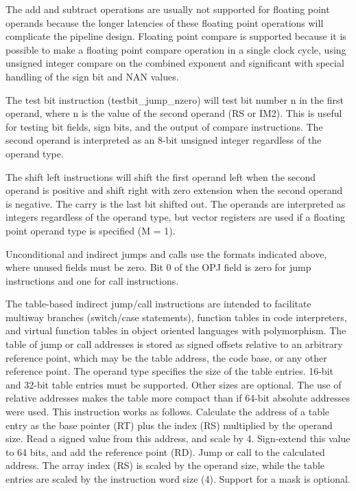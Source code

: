 \documentclass[forwardcom.tex]{subfiles}
\begin{document}
The add and subtract operations are usually not supported for floating point operands because the longer latencies of these floating point operations will complicate the pipeline design. Floating point compare is supported because it is possible to make a floating point compare operation in a single clock cycle, using unsigned integer compare on the combined exponent and significant with special handling of the sign bit and NAN values.
\vspace{2mm}

The test bit instruction (testbit\_jump\_nzero) will test bit number n in the first operand, where n is the value of the second operand (RS or IM2). This is useful for testing bit fields, sign bits, and the output of compare instructions. The second operand is interpreted as an 8-bit unsigned integer regardless of the operand type.
\vspace{2mm}

The shift left instructions will shift the first operand left when the second operand is positive and shift right with zero extension when the second operand is negative. The carry is the last bit shifted out. The operands are interpreted as integers regardless of the operand type, but vector registers are used if a floating point operand type is specified (M = 1).
\vspace{2mm}

Unconditional and indirect jumps and calls use the formats indicated above, where unused fields must be zero. Bit 0 of the OPJ field is zero for jump instructions and one for call instructions.
\vspace{2mm}

\label{jumpTableInstruction}
The table-based indirect jump/call instructions are intended to facilitate multiway branches (switch/case statements), function tables in code interpreters, and virtual function tables in object oriented languages with polymorphism. The table of jump or call addresses is stored as signed offsets relative to an arbitrary reference point, which may be the table address, the code base, or any other reference point. The operand type specifies the size of the table entries. 16-bit and 32-bit table entries must be supported. Other sizes are optional. The use of relative addresses makes the table more compact than if 64-bit absolute addresses were used. This instruction works as follows. Calculate the address of a table entry as the base pointer (RT) plus the index (RS) multiplied by the operand size. Read a signed value from this address, and scale by 4. Sign-extend this value to 64 bits, and add the reference point (RD). Jump or call to the calculated address. The array index (RS) is scaled by the operand size, while the table entries are scaled by the instruction word size (4). Support for a mask is optional.
\vspace{2mm}
\end{document}
